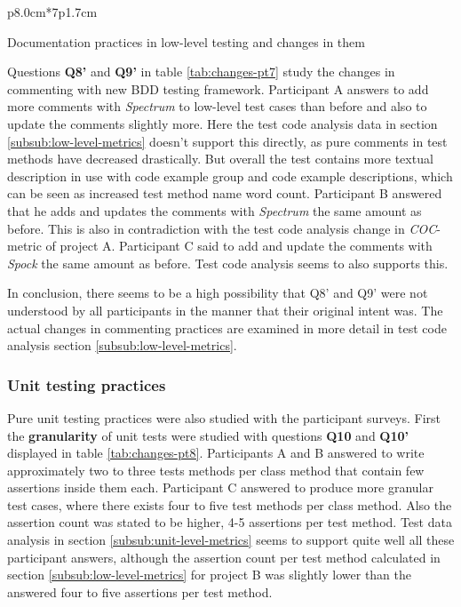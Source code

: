 \begin{table}[H]
{\begin{tttabular}{p{8.0cm}*{7}{p{1.7cm}}}
            \end{tttabular}}
            \caption {Documentation practices in low-level testing and changes in them} \label{tab:changes-pt7}
    \end{table}

Questions \textbf{Q8'} and \textbf{Q9'} in table \ref{tab:changes-pt7} study the changes in commenting with new BDD testing framework.
Participant A answers to add more comments with \textit{Spectrum} to low-level test cases
than before and also to update the comments slightly more.
Here the test code analysis data in section \ref{subsub:low-level-metrics} doesn't support this directly, as pure comments
in test methods have decreased drastically. But overall
the test contains more textual description in use with code example group and code example descriptions, which can be seen
as increased test method name word count. Participant B answered that he adds and updates the comments with \textit{Spectrum} the same amount as before.
This is also in contradiction with the test code analysis change in \textit{COC}-metric of project A. Participant C said to add and
update the comments with \textit{Spock} the same amount as before. Test code analysis seems to also supports this.

In conclusion, there seems to be a high possibility
that Q8' and Q9' were not understood by all participants in the manner that their original intent was. The actual changes
in commenting practices are examined in more detail in test code analysis section \ref{subsub:low-level-metrics}.

\subsubsection{Unit testing practices}
Pure unit testing practices were also studied with the participant surveys. First the \textbf{granularity} of unit tests were
studied with questions \textbf{Q10} and \textbf{Q10'} displayed in table \ref{tab:changes-pt8}. Participants A and B answered
to write approximately two to three tests methods per class method that contain few assertions inside them each. Participant
C answered to produce more granular test cases, where there exists four to five test methods per class method.
Also the assertion count was stated to be higher, 4-5 assertions per test method. Test data analysis in section \ref{subsub:unit-level-metrics}
seems to support quite well all these participant answers, although the assertion count per test method calculated in section \ref{subsub:low-level-metrics}
for project B was slightly lower than the answered four to five assertions per test method.

